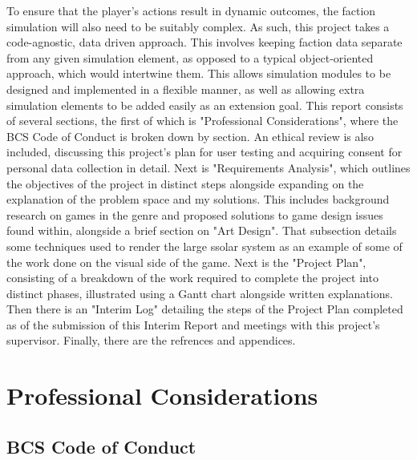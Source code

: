 \documentclass{report}
\begin{document}
To ensure that the player's actions result in dynamic outcomes, the faction simulation will also need to be suitably complex. As such, this project takes a code-agnostic, data driven approach. This involves keeping faction data separate from any given simulation element, as opposed to a typical object-oriented approach, which would intertwine them. This allows simulation modules to be designed and implemented in a flexible manner, as well as allowing extra simulation elements to be added easily as an extension goal.
\newline
\newline
This report consists of several sections, the first of which is "Professional Considerations", where the BCS Code of Conduct is broken down by section. An ethical review is also included, discussing this project's plan for user testing and acquiring consent for personal data collection in detail. Next is "Requirements Analysis", which outlines the objectives of the project in distinct steps alongside expanding on the explanation of the problem space and my solutions. This includes background research on games in the genre and proposed solutions to game design issues found within, alongside a brief section on "Art Design". That subsection details some techniques used to render the large ssolar system as an example of some of the work done on the visual side of the game.
Next is the "Project Plan", consisting of a breakdown of the work required to complete the project into distinct phases, illustrated using a Gantt chart alongside written explanations. Then there is an "Interim Log" detailing the steps of the Project Plan completed as of the submission of this Interim Report and meetings with this project's supervisor. Finally, there are the refrences and appendices.

\chapter{Professional Considerations}

\section{BCS Code of Conduct}
\end{document}
